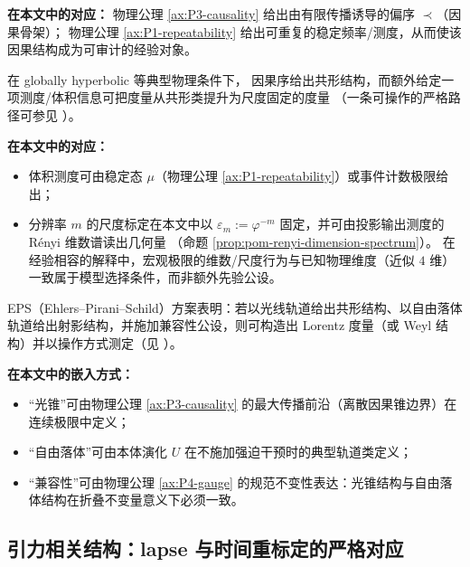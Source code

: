 \noindent\textbf{在本文中的对应：}
物理公理 \ref{ax:P3-causality} 给出由有限传播诱导的偏序 \(\prec\)（因果骨架）；
物理公理 \ref{ax:P1-repeatability} 给出可重复的稳定频率/测度，从而使该因果结构成为可审计的经验对象。

\begin{hproposition}\label{prop:appH2-causal-plus-volume-metric}
在 globally hyperbolic 等典型物理条件下，
因果序给出共形结构，而额外给定一项测度/体积信息可把度量从共形类提升为尺度固定的度量
（一条可操作的严格路径可参见 \cite{MartinPanangadenSpacetimeGeometryCausalMeasurement}）。
\end{hproposition}

\noindent\textbf{在本文中的对应：}
\begin{itemize}
  \item 体积测度可由稳定态 \(\mu\)（物理公理 \ref{ax:P1-repeatability}）或事件计数极限给出；
  \item 分辨率 \(m\) 的尺度标定在本文中以 \(\varepsilon_m:=\varphi^{-m}\) 固定，并可由投影输出测度的 Rényi 维数谱读出几何量
  （命题 \ref{prop:pom-renyi-dimension-spectrum}）。
  在经验相容的解释中，宏观极限的维数/尺度行为与已知物理维度（近似 \(4\) 维）一致属于模型选择条件，而非额外先验公设。
\end{itemize}

\begin{hproposition}\label{prop:appH2-eps}
EPS（Ehlers--Pirani--Schild）方案表明：若以光线轨道给出共形结构、以自由落体轨道给出射影结构，并施加兼容性公设，则可构造出 Lorentz 度量（或 Weyl 结构）并以操作方式测定（见 \cite{EhlersPiraniSchild1972FreeFallLight,Trautman2012EditorialEPS}）。
\end{hproposition}

\noindent\textbf{在本文中的嵌入方式：}
\begin{itemize}
  \item “光锥”可由物理公理 \ref{ax:P3-causality} 的最大传播前沿（离散因果锥边界）在连续极限中定义；
  \item “自由落体”可由本体演化 \(U\) 在不施加强迫干预时的典型轨道类定义；
  \item “兼容性”可由物理公理 \ref{ax:P4-gauge} 的规范不变性表达：光锥结构与自由落体结构在折叠不变量意义下必须一致。
\end{itemize}

\subsection{引力相关结构：lapse 与时间重标定的严格对应}
\label{subsec:appH3-gravity}

